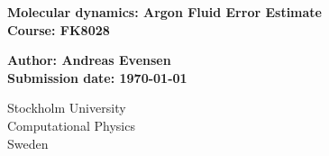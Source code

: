 \thispagestyle{empty}
\begin{titlepage}
   \begin{center}
       \huge
       \textbf{Molecular dynamics: Argon Fluid Error Estimate}\\
       \vspace*{1cm}
       \textbf{Course: FK8028}
       \large

       \vspace*{0.5cm}
       \textbf{Author: Andreas Evensen}\\
       \vspace*{.5cm}
       \small
       \vspace*{1.cm}
       \textbf{Submission date: \today}\\
       \vspace*{.5cm}
       \vspace{0.8cm}
     
       \small
       Stockholm University\\
       Computational Physics\\
       Sweden\\
   \end{center}
\end{titlepage}